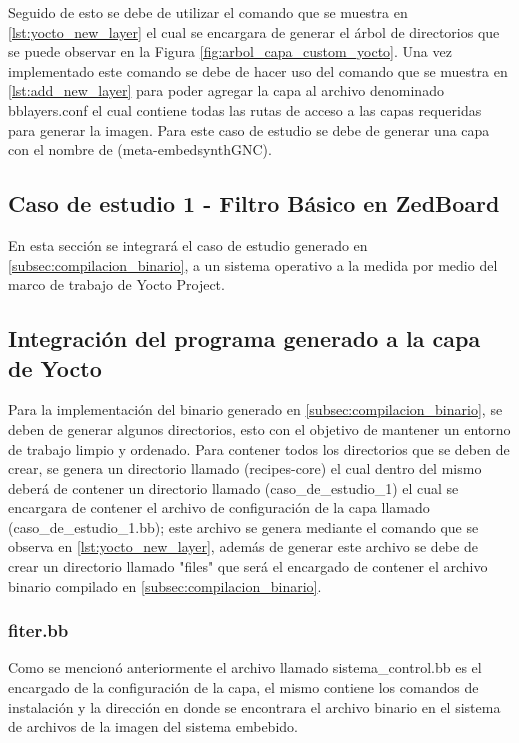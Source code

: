Seguido de esto se debe de utilizar el comando que se muestra en \ref{lst:yocto_new_layer} el cual se encargara de generar el árbol de directorios que se puede observar en la Figura \ref{fig:arbol_capa_custom_yocto}. Una vez implementado este comando se debe de hacer uso del comando que se muestra en \ref{lst:add_new_layer} para poder agregar la capa al archivo denominado bblayers.conf el cual contiene todas las rutas de acceso a las capas requeridas para generar la imagen. Para este caso de estudio se debe de generar una capa con el nombre de (meta-embedsynthGNC).


\subsection{Caso de estudio 1 - Filtro Básico en ZedBoard}

En esta sección se integrará el caso de estudio generado en \ref{subsec:compilacion_binario}, a un sistema operativo a la medida por medio del marco de trabajo de Yocto Project.

\subsection{Integración del programa generado a la capa de Yocto}

Para la implementación del binario generado en \ref{subsec:compilacion_binario}, se deben de generar algunos directorios, esto con el objetivo de mantener un entorno de trabajo limpio y ordenado. Para contener todos los directorios que se deben de crear, se genera un directorio llamado (recipes-core) el cual dentro del mismo deberá de contener un directorio llamado (caso\_de\_estudio\_1) el cual se encargara de contener el archivo de configuración de la capa llamado (caso\_de\_estudio\_1.bb); este archivo se genera mediante el comando que se observa en \ref{lst:yocto_new_layer}, además de generar este archivo se debe de crear un directorio llamado "files" que será el encargado de contener el archivo binario compilado en \ref{subsec:compilacion_binario}.

\subsubsection{fiter.bb}

Como se mencionó anteriormente el archivo llamado sistema\_control.bb es el encargado de la configuración de la capa, el mismo contiene los comandos de instalación y la dirección en donde se encontrara el archivo binario en el sistema de archivos de la imagen del sistema embebido.

